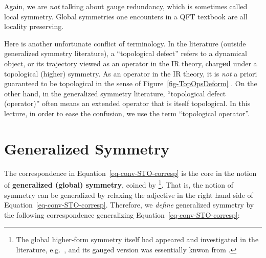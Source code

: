 \documentclass[
  letterpaper,
  DIV=11,
  numbers=noendperiod]{scrreport}
\begin{document}
\begin{tcolorbox}[enhanced jigsaw, colback=white, toprule=.15mm, left=2mm, coltitle=black, opacityback=0, colbacktitle=quarto-callout-note-color!10!white, rightrule=.15mm, breakable, toptitle=1mm, titlerule=0mm, colframe=quarto-callout-note-color-frame, bottomtitle=1mm, title=\textcolor{quarto-callout-note-color}{\faInfo}\hspace{0.5em}{\textsf{Terminology}}, bottomrule=.15mm, opacitybacktitle=0.6, arc=.35mm, leftrule=.75mm]

Again, we are \emph{not} talking about gauge redundancy, which is
sometimes called local symmetry. Global symmetries one encounters in a
QFT textbook are all locality preserving.

\end{tcolorbox}

\begin{tcolorbox}[enhanced jigsaw, colback=white, toprule=.15mm, left=2mm, coltitle=black, opacityback=0, colbacktitle=quarto-callout-note-color!10!white, rightrule=.15mm, breakable, toptitle=1mm, titlerule=0mm, colframe=quarto-callout-note-color-frame, bottomtitle=1mm, title=\textcolor{quarto-callout-note-color}{\faInfo}\hspace{0.5em}{\textsf{Terminology}}, bottomrule=.15mm, opacitybacktitle=0.6, arc=.35mm, leftrule=.75mm]

Here is another unfortunate conflict of terminology. In the literature
(outside generalized symmetry literature), a ``topological defect''
refers to a dynamical object, or its trajectory viewed as an operator in
the IR theory, charg\textbf{ed} under a topological (higher) symmetry.
As an operator in the IR theory, it is \emph{not} a priori guaranteed to
be topological in the sense of Figure~\ref{fig-TopOpsDeform} . On the
other hand, in the generalized symmetry literature, ``topological defect
(operator)'' often means an extended operator that is itself
topological. In this lecture, in order to ease the confusion, we use the
term ``topological operator''.

\end{tcolorbox}

\hypertarget{generalized-symmetry}{%
\section{Generalized Symmetry}\label{generalized-symmetry}}

The correspondence in Equation~\ref{eq-conv-STO-corresp} is the core in
the notion of \textbf{generalized (global) symmetry}, coined by
\autocite{Gaiotto:2014kfa} \footnote{The global higher-form symmetry
  itself had appeared and investigated in the literature,
  e.g.~\autocite{Kapustin:2013uxa,Barkeshli:2014cna}, and its gauged
  version was essentially knwon from \autocite{KalbRamond}.}. That is,
the notion of symmetry can be generalized by relaxing the adjective in
the right hand side of Equation~\ref{eq-conv-STO-corresp}. Therefore, we
\emph{define} generalized symmetry by the following correspondence
generalizing Equation~\ref{eq-conv-STO-corresp}:
\end{document}
